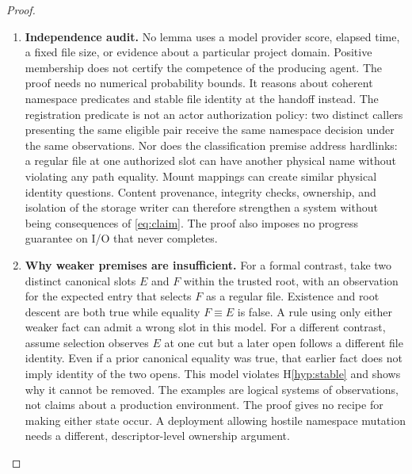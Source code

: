 \documentclass[12pt]{article}
\begin{document}
\begin{proof}
\begin{enumerate}
\item \textbf{Independence audit.}
No lemma uses a model provider score, elapsed time, a fixed file
size, or evidence about a particular project domain. Positive
membership does not certify the competence of the producing agent.
The proof needs no numerical probability bounds. It reasons about
coherent namespace predicates and stable file identity at the
handoff instead. The registration predicate is not an actor
authorization policy: two distinct callers presenting the same
eligible pair receive the same namespace decision under the same
observations. Nor does the classification premise address hardlinks:
a regular file at one authorized slot can have another physical name
without violating any path equality. Mount mappings can create similar
physical identity questions. Content provenance, integrity checks,
ownership, and isolation of the storage writer can therefore strengthen
a system without being consequences of \eqref{eq:claim}.
The proof also imposes no progress guarantee on I/O that never completes.

\item \textbf{Why weaker premises are insufficient.}
For a formal contrast, take two distinct canonical slots $E$ and
$F$ within the trusted root, with an observation for the expected
entry that selects $F$ as a regular file. Existence and root descent
are both true while equality $F\equiv E$ is false. A rule using only
either weaker fact can admit a wrong slot in this model. For a
different contrast, assume selection observes $E$ at one cut but
a later open follows a different file identity. Even if a prior
canonical equality was true, that earlier fact does not imply
identity of the two opens. This model violates H\ref{hyp:stable}
and shows why it cannot be removed. The examples are logical
systems of observations, not claims about a production
environment. The proof gives no recipe for making either state
occur. A deployment allowing hostile namespace mutation needs
a different, descriptor-level ownership argument.



\end{enumerate}
\end{proof}
\end{document}
